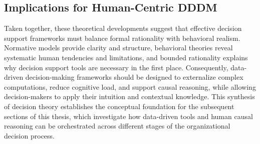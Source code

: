 \documentclass{sfuthesis}
\begin{document}
\subsection{Implications for Human-Centric DDDM}
Taken together, these theoretical developments suggest that effective decision support frameworks must balance formal rationality with behavioral realism. Normative models provide clarity and structure, behavioral theories reveal systematic human tendencies and limitations, and bounded rationality explains why decision support tools are necessary in the first place. Consequently, data-driven decision-making frameworks should be designed to externalize complex computations, reduce cognitive load, and support causal reasoning, while allowing decision-makers to apply their intuition and contextual knowledge. This synthesis of decision theory establishes the conceptual foundation for the subsequent sections of this thesis, which investigate how data-driven tools and human causal reasoning can be orchestrated across different stages of the organizational decision process.
\end{document}
